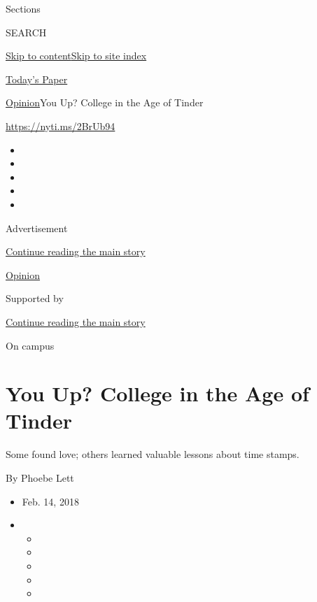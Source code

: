 Sections

SEARCH

\protect\hyperlink{site-content}{Skip to
content}\protect\hyperlink{site-index}{Skip to site index}

\href{https://myaccount.nytimes.com/auth/login?response_type=cookie\&client_id=vi}{}

\href{https://www.nytimes.com/section/todayspaper}{Today's Paper}

\href{/section/opinion}{Opinion}\textbar{}You Up? College in the Age of
Tinder

\href{https://nyti.ms/2BrUb94}{https://nyti.ms/2BrUb94}

\begin{itemize}
\item
\item
\item
\item
\item
\end{itemize}

Advertisement

\protect\hyperlink{after-top}{Continue reading the main story}

\href{/section/opinion}{Opinion}

Supported by

\protect\hyperlink{after-sponsor}{Continue reading the main story}

On campus

\hypertarget{you-up-college-in-the-age-of-tinder}{%
\section{You Up? College in the Age of
Tinder}\label{you-up-college-in-the-age-of-tinder}}

Some found love; others learned valuable lessons about time stamps.

By Phoebe Lett

\begin{itemize}
\item
  Feb. 14, 2018
\item
  \begin{itemize}
  \item
  \item
  \item
  \item
  \item
  \end{itemize}
\end{itemize}

